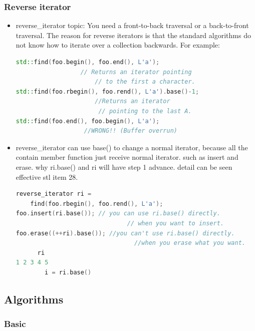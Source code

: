 \documentclass[a4paper,12pt,twoside]{book}
\begin{document}
\subsubsection{Reverse iterator}
\begin{itemize}
\item reverse\_iterator topic:
You need a front-to-back traversal or a back-to-front traversal. The reason for reverse iterators is that the standard algorithms do not know how to iterate over a collection backwards. For example:
\begin{lstlisting}[frame=single, language=c++]
std::find(foo.begin(), foo.end(), L'a');
                  // Returns an iterator pointing
                      // to the first a character.
std::find(foo.rbegin(), foo.rend(), L'a').base()-1;
                      //Returns an iterator
                       // pointing to the last A.
std::find(foo.end(), foo.begin(), L'a');
                   //WRONG!! (Buffer overrun)
\end{lstlisting}

\item reverse\_iterator can use base() to change a normal iterator, because all the contain member function just receive normal iterator. such as insert and erase.
why ri.base() and ri will have step 1 advance. detail can be seen effective stl item 28.
\begin{lstlisting}[frame=single, language=c++]
reverse_iterator ri =
    find(foo.rbegin(), foo.rend(), L'a');
foo.insert(ri.base()); // you can use ri.base() directly.
                               // when you want to insert.
foo.erase((++ri).base()); //you can't use ri.base() directly.
                                 //when you erase what you want.
      ri
1 2 3 4 5
        i = ri.base()
\end{lstlisting}



\end{itemize}

\subsection{Algorithms}

\subsubsection{Basic}
\end{document}
